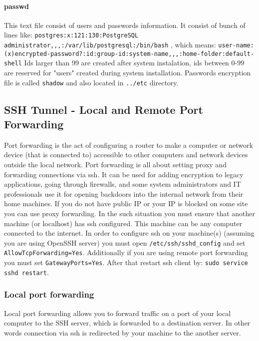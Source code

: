 \documentclass{article}[12pt]
\newcommand{\q}[1]{\texttt{#1}}
\begin{document}
{\paragraph{passwd} This text file consist of users and passwords information.
It consist of bunch of lines like: \newline
\texttt{postgres:x:121:130:PostgreSQL administrator,,,:/var/lib/postgresql:/bin/bash} , which means:
\texttt{user-name:(x)encrypted-password?:id:group-id:system-name,,,:home-folder:default-shell} \newline
Ids larger than 99 are created after system instalation, ids between 0-99 are reserved for "users" created during system installation.
Passwords encryption file is called \texttt{shadow} and also located in \texttt{../etc} directory.


\subsection{SSH Tunnel - Local and Remote Port Forwarding}
Port forwarding is the act of configuring a router to make a computer or network device (that is connected to) accessible to other computers and network devices outside the local network.
Port forwarding is all about setting proxy and forwarding connections via ssh.
It can be used for adding encryption to legacy applications, going through firewalls, and some system administrators and IT professionals use it for opening backdoors into the internal network from their home machines.
If you do not have public IP or your IP is blocked on some site you can use proxy forwarding.
In the such situation you must ensure that another machine (or localhost) has ssh configured.
This machine can be any computer connected to the internet.
In order to configure ssh on your machine(s) (assuming you are using OpenSSH server) you must open \q{/etc/ssh/sshd\_config} and set \q{AllowTcpForwarding=Yes}.
Additionally if you are using remote port forwarding you must set \q{GatewayPorts=Yes}.
After that restart ssh client by: \q{sudo service sshd restart}.

\subsubsection{Local port forwarding}
Local port forwarding allows you to forward traffic on a port of your local computer to the SSH server, which is forwarded to a destination server.
In other words connection via ssh is redirected by your machine to the another server.


}
\end{document}
